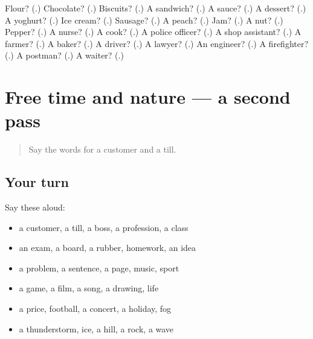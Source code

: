\begin{tcolorbox}[breakable,colback=teal!4,colframe=teal!35!black,title={Before you move on}]
Flour? (\textbf{}.) Chocolate? (\textbf{}.) Biscuits? (\textbf{}.) A sandwich? (\textbf{}.) A sauce? (\textbf{}.) A dessert? (\textbf{}.) A yoghurt? (\textbf{}.) Ice cream? (\textbf{}.) Sausage? (\textbf{}.) A peach? (\textbf{}.) Jam? (\textbf{}.) A nut? (\textbf{}.) Pepper? (\textbf{}.) A nurse? (\textbf{}.) A cook? (\textbf{}.) A police officer? (\textbf{}.) A shop assistant? (\textbf{}.) A farmer? (\textbf{}.) A baker? (\textbf{}.) A driver? (\textbf{}.) A lawyer? (\textbf{}.) An engineer? (\textbf{}.) A firefighter? (\textbf{}.) A postman? (\textbf{}.) A waiter? (\textbf{}.)
\end{tcolorbox}
\section[(dialogue)]{Free time and nature — a second pass}

\label{lesson:RU-R115-second-pass-free-time-and-nature}



\begin{quote}
Say the words for a customer and a till.
\end{quote}

\subsection*{Your turn}
Say these aloud:

\begin{itemize}
\raggedright
  \item a customer, a till, a boss, a profession, a class
  \item an exam, a board, a rubber, homework, an idea
  \item a problem, a sentence, a page, music, sport
  \item a game, a film, a song, a drawing, life
  \item a price, football, a concert, a holiday, fog
  \item a thunderstorm, ice, a hill, a rock, a wave
\end{itemize}


